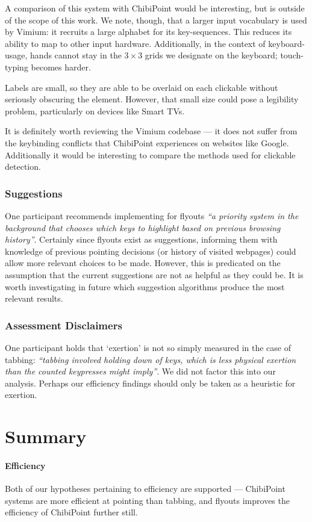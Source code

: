\documentclass[a4paper, 12pt]{report}
\begin{document}
A comparison of this system with ChibiPoint would be interesting, but is outside of the scope of this work. We note, though, that a larger input vocabulary is used by Vimium: it recruits a large alphabet for its key-sequences. This reduces its ability to map to other input hardware. Additionally, in the context of keyboard-usage, hands cannot stay in the $3\times3$ grids we designate on the keyboard; touch-typing becomes harder.

Labels are small, so they are able to be overlaid on each clickable without seriously obscuring the element. However, that small size could pose a legibility problem, particularly on devices like Smart TVs.

It is definitely worth reviewing the Vimium codebase --- it does not suffer from the keybinding conflicts that ChibiPoint experiences on websites like Google. Additionally it would be interesting to compare the methods used for clickable detection.
\subsubsection{Suggestions}
One participant recommends implementing for flyouts \textit{``a priority system in the background that chooses which keys to highlight based on previous browsing history''}. Certainly since flyouts exist as suggestions, informing them with knowledge of previous pointing decisions (or history of visited webpages) could allow more relevant choices to be made. However, this is predicated on the assumption that the current suggestions are not as helpful as they could be. It is worth investigating in future which suggestion algorithms produce the most relevant results.

\subsubsection{Assessment Disclaimers}
One participant holds that `exertion' is not so simply measured in the case of tabbing: \textit{``tabbing involved holding down of keys, which is less physical exertion than the counted keypresses might imply''}. We did not factor this into our analysis. Perhaps our efficiency findings should only be taken as a heuristic for exertion.

\section{Summary}
\paragraph{Efficiency}
Both of our hypotheses pertaining to efficiency are supported --- ChibiPoint systems are more efficient at pointing than tabbing, and flyouts improves the efficiency of ChibiPoint further still.
\end{document}
